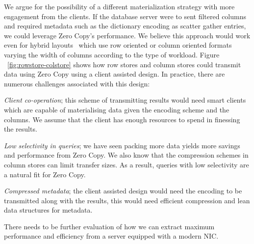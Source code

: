 We argue for the possibility of a different materialization strategy with more engagement from the 
clients. If the database server were to sent filtered columns and required metadata such as the 
dictionary encoding as scatter gather entries, we could leverage Zero Copy's performance. We believe 
this approach would work even for hybrid layouts~\cite{hyrise-hybridstores} which use row oriented or 
column oriented formats varying the width of columns according to the type of workload. Figure ~\ref{fig:rowstore-colstore}
shows how row stores and column stores could transmit data using Zero Copy using a client assisted design.
In practice, there are numerous challenges associated with this design:
\begin{myitemize}
\item {\em Client co-operation}; this scheme of transmitting results would need smart clients which are 
capable of materialising data given the encoding scheme and the columns. We assume that the client 
has enough resources to spend in finessing the results.
\item {\em Low selectivity in queries}; we have seen packing more data yields more savings and performance 
from Zero Copy. We also know that the compression schemes in column stores can limit transfer sizes. 
As a result, queries with low selectivity are a natural fit for Zero Copy.
\item {\em Compressed metadata}; the client assisted design would need the encoding to be transmitted
along with the results, this would need efficient compression and lean data structures for metadata.
\end{myitemize}
There needs to be further evaluation of how we can extract maximum performance and efficiency from 
a server equipped with a modern NIC.
\newline


